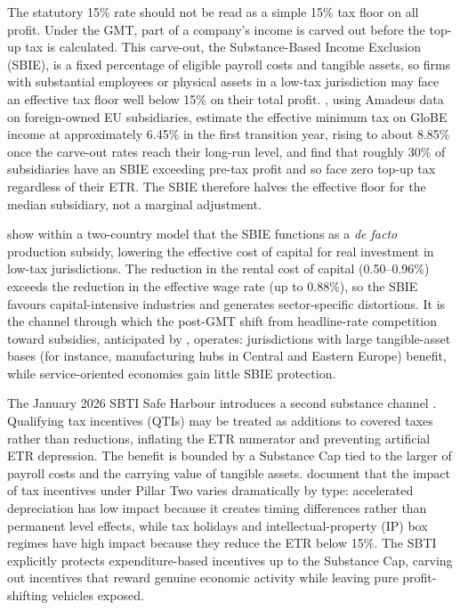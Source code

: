 \documentclass[11pt,a4paper]{article}
\begin{document}
The statutory 15\% rate should not be read as a simple 15\% tax floor on all profit. Under the GMT, part of a company's income is carved out before the top-up tax is calculated. This carve-out, the Substance-Based Income Exclusion (SBIE), is a fixed percentage of eligible payroll costs and tangible assets, so firms with substantial employees or physical assets in a low-tax jurisdiction may face an effective tax floor well below 15\% on their total profit. \citet{devereux2023}, using Amadeus data on foreign-owned EU subsidiaries, estimate the effective minimum tax on GloBE income at approximately 6.45\% in the first transition year, rising to about 8.85\% once the carve-out rates reach their long-run level, and find that roughly 30\% of subsidiaries have an SBIE exceeding pre-tax profit and so face zero top-up tax regardless of their ETR. The SBIE therefore halves the effective floor for the median subsidiary, not a marginal adjustment.

 \citet{schjelderup2024} show within a two-country model that the SBIE functions as a \textit{de facto} production subsidy, lowering the effective cost of capital for real investment in low-tax jurisdictions. The reduction in the rental cost of capital (0.50--0.96\%) exceeds the reduction in the effective wage rate (up to 0.88\%), so the SBIE favours capital-intensive industries and generates sector-specific distortions. It is the channel through which the post-GMT shift from headline-rate competition toward subsidies, anticipated by \citet{janeba2023}, operates: jurisdictions with large tangible-asset bases (for instance, manufacturing hubs in Central and Eastern Europe) benefit, while service-oriented economies gain little SBIE protection.

The January 2026 SBTI Safe Harbour introduces a second substance channel \citep{oecd2026}. Qualifying tax incentives (QTIs) may be treated as additions to covered taxes rather than reductions, inflating the ETR numerator and preventing artificial ETR depression. The benefit is bounded by a Substance Cap tied to the larger of payroll costs and the carrying value of tangible assets. \citet{ferreiraliotti2022} document that the impact of tax incentives under Pillar Two varies dramatically by type: accelerated depreciation has low impact because it creates timing differences rather than permanent level effects, while tax holidays and intellectual-property (IP) box regimes have high impact because they reduce the ETR below 15\%. The SBTI explicitly protects expenditure-based incentives up to the Substance Cap, carving out incentives that reward genuine economic activity while leaving pure profit-shifting vehicles exposed. 
\end{document}
